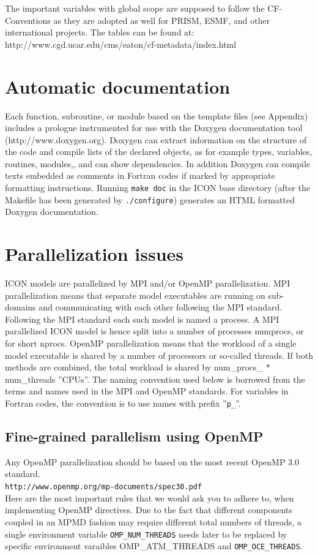 \documentclass[a4paper,11pt,DIV16,BCOR1cm,titlepage]{scrartcl}
\begin{document}
The important variables with global scope are supposed to follow the   
CF-Conventions as they are adopted as well for PRISM, ESMF, and other  
international projects. The tables can be found at:  
http://www.cgd.ucar.edu/cms/eaton/cf-metadata/index.html    
     
%
\section{Automatic documentation}  
%
Each function, subroutine, or module based on the template files (see Appendix) includes a 
prologue instrumented for use with the Doxygen documentation tool (http://www.doxygen.org). 
Doxygen can extract information on the structure of the code and compile lists of the declared
objects, as for example types, variables, routines, modules,, and can show dependencies. In 
addition Doxygen can compile texts embedded as comments in Fortran codes if marked by
appropriate formatting instructions.
%
Running \texttt{make doc} in the ICON base directory (after the Makefile has been 
generated by \texttt{./configure}) generates an HTML formatted Doxygen documentation.

%
\section{Parallelization issues}
%
ICON models are parallelized by MPI and/or OpenMP parallelization. MPI parallelization 
means that separate model executables are running on sub-domains and communicating 
with each other following the MPI standard. Following the MPI standard each such model 
is named a process. A MPI parallelized ICON model is hence split into a number of processes 
numprocs, or for short nprocs.
%
OpenMP parallelization means that the workload of a single model executable is shared by a 
number of processors or so-called threads. If both methods are combined, the total workload is 
shared by num\_procs\_ * num\_threads ''CPUs''.
The naming convention used below is borrowed from the terms and names used in the MPI and 
OpenMP standards. For variables in Fortran codes, the convention is to use names with prefix 
''\texttt{p\_}''.\\
%
\subsection{Fine-grained parallelism using OpenMP}
%
Any OpenMP parallelization should be based on the most recent OpenMP 3.0 standard. \\
{\color{blue}
\texttt{http://www.openmp.org/mp-documents/spec30.pdf} }\\
Here are the most important rules that we would ask you to adhere to, when 
implementing OpenMP directives.
%
Due to the fact that different components coupled in an MPMD fashion may require different total 
numbers of threads, a single environment variable \texttt{OMP\_NUM\_THREADS} needs later to 
be replaced by specific environment varaibles OMP\_ATM\_THREADS and 
\texttt{OMP\_OCE\_THREADS}.
\end{document}
